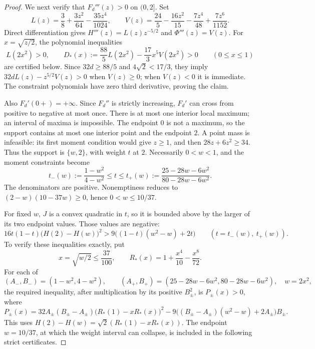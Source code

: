 \begin{proof}
We next verify that $F_d'''(z)>0$ on $(0,2]$.  Set
\[
 L(z)=\frac38+\frac{3z^2}{64}-\frac{35z^4}{1024},\qquad
 V(z)=\frac{24}{5}-\frac{16z^2}{15}-\frac{7z^4}{48}
                         +\frac{7z^6}{1152}.
\]
Direct differentiation gives $H'''(z)=L(z)z^{-5/2}$ and
$\Phi'''(z)=V(z)$.  For $x=\sqrt{z/2}$, the polynomial inequalities
\[
 L(2x^2)>0,\qquad
 D_*(x):=\frac{88}{5}L(2x^2)-\frac{17}{3}x^5V(2x^2)>0
 \qquad(0\le x\le1)
\]
are certified below.  Since $32d\ge88/5$ and $4\sqrt2<17/3$, they imply
$32dL(z)-z^{5/2}V(z)>0$ when $V(z)\ge0$; when $V(z)<0$ it is immediate.
The constraint polynomials have zero third derivative, proving the
claim.

Also $F_d'(0+)=+\infty$.  Since $F_d''$ is strictly increasing, $F_d'$
can cross from positive to negative at most once.  There is at most
one interior local maximum; an interval of maxima is impossible.
The endpoint $0$ is not a maximum, so the support contains at most
one interior point and the endpoint $2$.  A point mass is infeasible:
its first moment condition would give $z\ge1$, and then
$28z+6z^2\ge34$.  Thus the support is $\{w,2\}$, with weight $t$ at $2$.
Necessarily $0<w<1$, and the moment constraints become
\[
 t_-(w):=\frac{1-w^2}{4-w^2}\le t\le
 t_+(w):=\frac{25-28w-6w^2}{80-28w-6w^2}.
\]
The denominators are positive.  Nonemptiness reduces to
$(2-w)(10-37w)\ge0$, hence $0<w\le10/37$.

For fixed $w$, $J$ is a convex quadratic in $t$, so it is bounded above
by the larger of its two endpoint values.  Those values are negative:
\[
 16t(1-t)\bigl(H(2)-H(w)\bigr)^2
 >9\bigl((1-t)(w^2-w)+2t\bigr)
 \qquad(t=t_-(w),\ t_+(w)).
\]
To verify these inequalities exactly, put
\[
 x=\sqrt{w/2}\le\frac{37}{100},\qquad
 R_*(x)=1+\frac{x^4}{10}-\frac{x^8}{72}.
\]
For each of
\[
 (A_-,B_-)=(1-w^2,4-w^2),\qquad
 (A_+,B_+)=(25-28w-6w^2,80-28w-6w^2),\quad w=2x^2,
\]
the required inequality, after multiplication by its positive
$B_\pm^2$, is $P_\pm(x)>0$, where
\[
 P_\pm(x)=32A_\pm(B_\pm-A_\pm)
                \bigl(R_*(1)-xR_*(x)\bigr)^2
 -9\bigl((B_\pm-A_\pm)(w^2-w)+2A_\pm\bigr)B_\pm.
\]
This uses $H(2)-H(w)=\sqrt2(R_*(1)-xR_*(x))$.
The endpoint $w=10/37$, at which the weight interval can collapse, is
included in the following strict certificates.


\end{proof}
